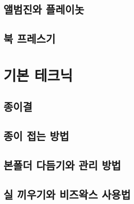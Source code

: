 \documentclass[12pt, a4paper, oneside]{book}
\begin{document}
	\section{앨범진와 플레이놋}

	\section{북 프레스기}










































	\newpage
	\chapter{기본 테크닉}





	\section{종이결}

	\section{종이 접는 방법}

	\section{본폴더 다듬기와 관리 방법}

	\section{실 끼우기와 비즈왁스 사용법}
\end{document}
